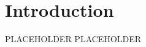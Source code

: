 \chapter{Introduction}
\lhead{\textcolor{\chapterColor}{\rule[-2pt]{\textwidth}{15pt}}}
PLACEHOLDER
\lipsum[1]
PLACEHOLDER
\clearpage